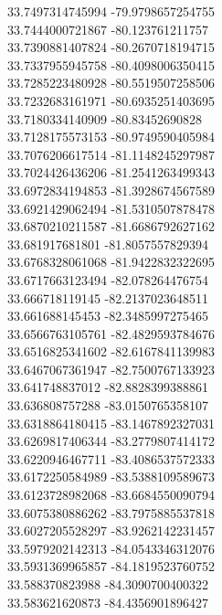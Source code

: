 {33.7497314745994	-79.9798657254755\\
33.7444000721867	-80.123761211757\\
33.7390881407824	-80.2670718194715\\
33.7337955945758	-80.4098006350415\\
33.7285223480928	-80.5519507258506\\
33.7232683161971	-80.6935251403695\\
33.7180334140909	-80.83452690828\\
33.7128175573153	-80.9749590405984\\
33.7076206617514	-81.1148245297987\\
33.7024426436206	-81.2541263499343\\
33.6972834194853	-81.3928674567589\\
33.6921429062494	-81.5310507878478\\
33.6870210211587	-81.6686792627162\\
33.681917681801	-81.8057557829394\\
33.6768328061068	-81.9422832322695\\
33.6717663123494	-82.078264476754\\
33.666718119145	-82.2137023648511\\
33.661688145453	-82.3485997275465\\
33.6566763105761	-82.4829593784676\\
33.6516825341602	-82.6167841139983\\
33.6467067361947	-82.7500767133923\\
33.641748837012	-82.8828399388861\\
33.636808757288	-83.0150765358107\\
33.6318864180415	-83.1467892327031\\
33.6269817406344	-83.2779807414172\\
33.6220946467711	-83.4086537572333\\
33.6172250584989	-83.5388109589673\\
33.6123728982068	-83.6684550090794\\
33.6075380886262	-83.7975885537818\\
33.6027205528297	-83.9262142231457\\
33.5979202142313	-84.0543346312076\\
33.5931369965857	-84.1819523760752\\
33.588370823988	-84.3090700400322\\
33.583621620873	-84.4356901896427\\
}
